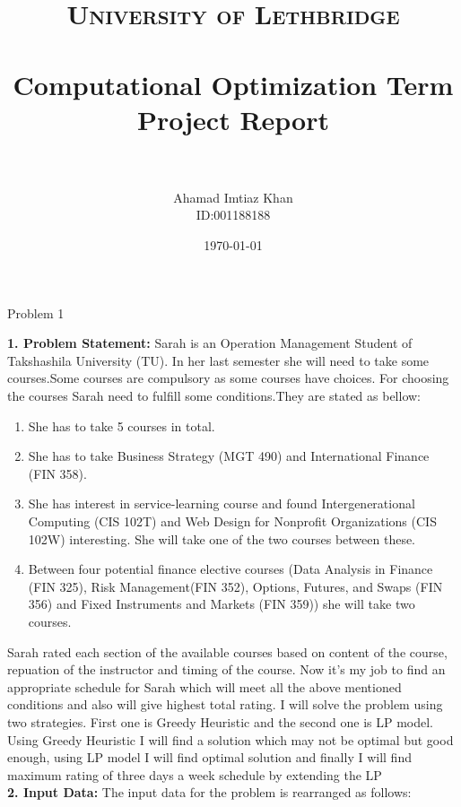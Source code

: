 \documentclass[paper=letter, fontsize=11pt]{scrartcl} %
\title{	
\normalfont \normalsize 
\textsc{University of Lethbridge} \\ [25pt] %
\horrule{0.5pt} \\[0.4cm] %
\huge Computational Optimization Term Project Report\\ %
\horrule{2pt} \\[0.5cm] %
}
\author{Ahamad Imtiaz Khan\\ID:001188188} %
\date{\normalsize\today} %
\begin{document}
\maketitle %

\begin{center}
\LARGE Problem 1
\end{center}

\Large \textbf{1. Problem Statement:}
\normalsize Sarah is an Operation Management Student of Takshashila University (TU). In her 
last semester she will need to take some courses.Some courses are compulsory as some courses have choices.
For choosing the courses Sarah need to fulfill some conditions.They are stated as bellow:
    
\begin{enumerate}
\item She has to take 5 courses in total.
\item She has to take Business Strategy (MGT 490) and International Finance (FIN 358).
\item She has interest in service-learning course and found Intergenerational Computing (CIS
102T) and Web Design for Nonprofit Organizations (CIS 102W) interesting. She will take one of the two courses 
between these.
\item Between four potential finance elective courses (Data Analysis in Finance (FIN 325),
 Risk Management(FIN 352), Options, Futures, and Swaps (FIN 356) and 
Fixed Instruments and Markets (FIN 359)) she will take two courses.
\end{enumerate}

Sarah rated each section of the available courses based on content of the course, repuation of the instructor and timing of
the course. Now it's my job to find an appropriate schedule for Sarah which will meet all the above mentioned conditions
and also will give highest total rating. I will solve the problem using two strategies. First one is Greedy Heuristic and 
the second one is LP model. Using Greedy Heuristic I will find a solution which may not be optimal but good enough, using
LP model I will find optimal solution and finally I will find maximum rating of three days a week schedule by extending 
the LP   \\

\Large \textbf{2. Input Data:}
\normalsize The input data for the problem is rearranged as follows: 
\end{document}
